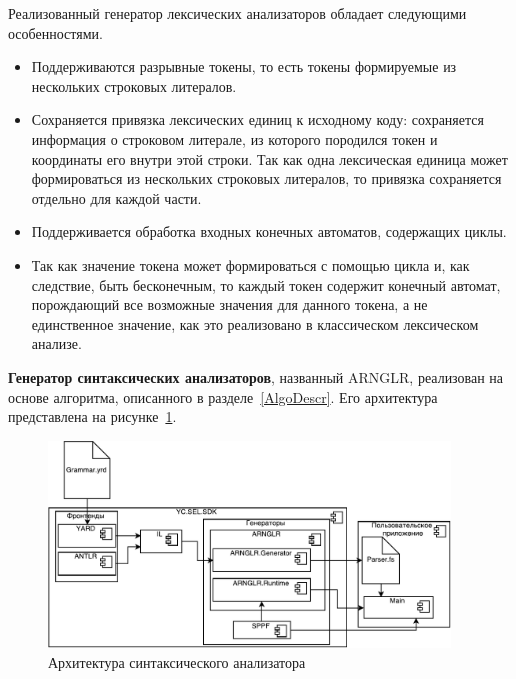 Реализованный генератор лексических анализаторов обладает следующими особенностями.
\begin{itemize}
    \item Поддерживаются разрывные токены, то есть токены формируемые из нескольких строковых литералов.
    \item Сохраняется привязка лексических единиц к исходному коду: сохраняется информация о строковом литерале, из которого породился токен и координаты его внутри этой строки. Так как одна лексическая единица может формироваться из нескольких строковых литералов, то привязка сохраняется отдельно для каждой части.
    \item Поддерживается обработка входных конечных автоматов, содержащих циклы.
    \item Так как значение токена может формироваться с помощью цикла и, как следствие, быть бесконечным, то каждый токен содержит конечный автомат, порождающий все возможные значения для данного токена, а не единственное значение, как это реализовано в классическом лексическом анализе.
\end{itemize}

\textbf{Генератор синтаксических анализаторов}, названный ARNGLR, реализован на основе алгоритма, описанного в разделе~\ref{AlgoDescr}. Его архитектура представлена на рисунке~\ref{fig:ParsArch}.  

\begin{figure}[h!]
\begin{center}
\includegraphics[width=0.95\textwidth]{pics/ARNGLRArch}
\caption{Архитектура синтаксического анализатора}
\label{fig:ParsArch} 
\end{center}
\end{figure}

